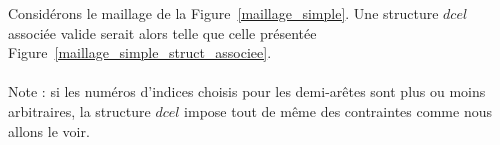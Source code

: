 \documentclass[]{article}
\begin{document}
\begin{multicols}{2}

	Considérons le maillage de la Figure~\ref{maillage_simple}. Une structure $dcel$ associée valide serait alors telle que celle présentée Figure~\ref{maillage_simple_struct_associee}.\\\\
	Note : si les numéros d'indices choisis pour les demi-arêtes sont plus ou moins arbitraires, la structure $dcel$ impose tout de même des contraintes comme nous allons le voir.
	

\end{multicols}
\end{document}

